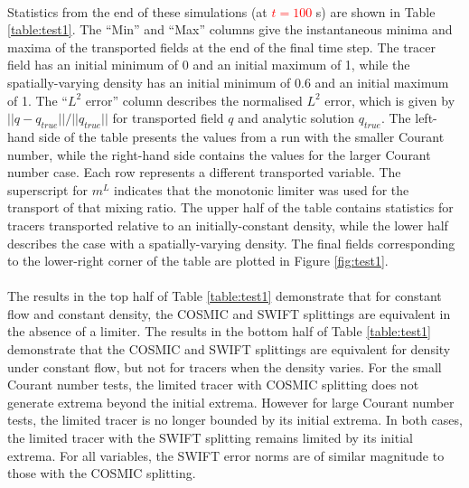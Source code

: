 \documentclass{ametsocV6.1}
\newcommand{\change}[1]{\textcolor{red}{#1}}
\begin{document}
\\
Statistics from the end of these simulations (at \change{$t=100$} s) are shown in Table \ref{table:test1}.
The ``Min'' and ``Max'' columns give the instantaneous minima and maxima of the transported fields at the end of the final time step.
The tracer field has an initial minimum of 0 and an initial maximum of 1, while the spatially-varying density has an initial minimum of 0.6 and an initial maximum of 1.
The ``$L^2$ error'' column describes the normalised $L^2$ error, which is given by $||q - q_{true}||/||q_{true}||$ for transported field $q$ and analytic solution $q_{true}$.
The left-hand side of the table presents the values from a run with the smaller Courant number, while the right-hand side contains the values for the larger Courant number case.
Each row represents a different transported variable.
The superscript for $m^L$ indicates that the monotonic limiter was used for the transport of that mixing ratio.
The upper half of the table contains statistics for tracers transported relative to an initially-constant density, while the lower half describes the case with a spatially-varying density.
The final fields corresponding to the lower-right corner of the table are plotted in Figure \ref{fig:test1}.\\
\\
The results in the top half of Table \ref{table:test1} demonstrate that for constant flow and constant density, the COSMIC and SWIFT splittings are equivalent in the absence of a limiter. The results in the bottom half of Table \ref{table:test1} demonstrate that the COSMIC and SWIFT splittings are equivalent for density under constant flow, but not for tracers when the density varies. 
For the small Courant number tests, the limited tracer with COSMIC splitting does not generate extrema beyond the initial extrema.
However for large Courant number tests, the limited tracer is no longer bounded by its initial extrema.
In both cases, the limited tracer with the SWIFT splitting remains limited by its initial extrema.
For all variables, the SWIFT error norms are of similar magnitude to those with the COSMIC splitting.
\end{document}
